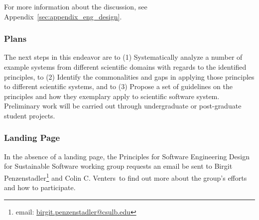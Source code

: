 For more information about the discussion, see Appendix~\ref{sec:appendix_eng_design}.

\subsubsection{Plans}
The next steps in this endeavor are to (1) Systematically analyze a number of example systems from different scientific domains with regards to the identified principles, to (2) Identify the commonalities and gaps in applying those principles to different scientific systems, and to (3) Propose a set of guidelines on the principles and how they exemplary apply to scientific software system. Preliminary work will be carried out through undergraduate or post-graduate student projects.

\subsubsection{Landing Page}
In the absence of a landing page, the Principles for Software Engineering Design for Sustainable Software working group requests an email be sent to Birgit Penzenstadler\footnote{email: \href{mailto:birgit.penzenstadler@csulb.edu}{birgit.penzenstadler@csulb.edu}} and Colin C. Venters\ to find out more about the group's efforts and how to participate.
